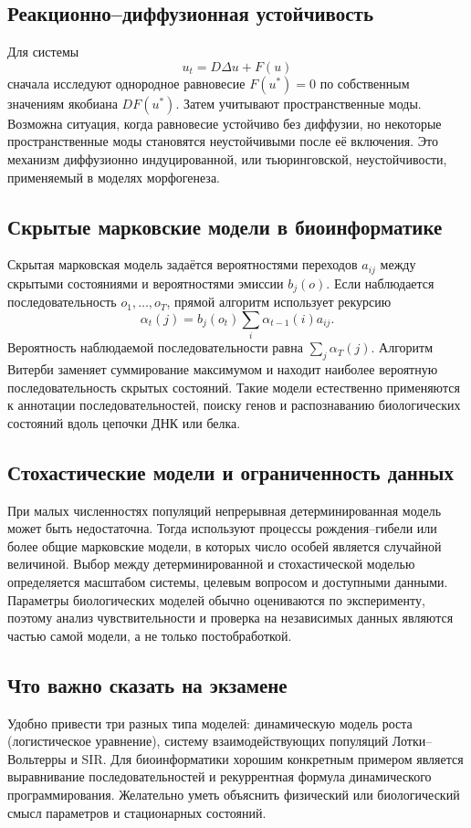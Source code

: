 \subsection{Реакционно--диффузионная устойчивость}

Для системы
\[
    u_t=D\Delta u+F(u)
\]
сначала исследуют однородное равновесие $F(u^*)=0$ по собственным значениям
якобиана $DF(u^*)$. Затем учитывают пространственные моды. Возможна ситуация,
когда равновесие устойчиво без диффузии, но некоторые пространственные моды
становятся неустойчивыми после её включения. Это механизм диффузионно
индуцированной, или тьюринговской, неустойчивости, применяемый в моделях
морфогенеза.

\subsection{Скрытые марковские модели в биоинформатике}

Скрытая марковская модель задаётся вероятностями переходов $a_{ij}$ между
скрытыми состояниями и вероятностями эмиссии $b_j(o)$. Если наблюдается
последовательность $o_1,\ldots,o_T$, прямой алгоритм использует рекурсию
\[
    \boxed{
    \alpha_t(j)
    =b_j(o_t)\sum_i\alpha_{t-1}(i)a_{ij}.
    }
\]
Вероятность наблюдаемой последовательности равна $\sum_j\alpha_T(j)$.
Алгоритм Витерби заменяет суммирование максимумом и находит наиболее вероятную
последовательность скрытых состояний. Такие модели естественно применяются к
аннотации последовательностей, поиску генов и распознаванию биологических
состояний вдоль цепочки ДНК или белка.

\subsection{Стохастические модели и ограниченность данных}

При малых численностях популяций непрерывная детерминированная модель может быть
недостаточна. Тогда используют процессы рождения--гибели или более общие
марковские модели, в которых число особей является случайной величиной. Выбор
между детерминированной и стохастической моделью определяется масштабом системы,
целевым вопросом и доступными данными. Параметры биологических моделей обычно
оцениваются по эксперименту, поэтому анализ чувствительности и проверка на
независимых данных являются частью самой модели, а не только постобработкой.

\subsection{Что важно сказать на экзамене}

Удобно привести три разных типа моделей: динамическую модель роста
(логистическое уравнение), систему взаимодействующих популяций
Лотки--Вольтерры и SIR. Для биоинформатики хорошим конкретным примером
является выравнивание последовательностей и рекуррентная формула
динамического программирования. Желательно уметь объяснить физический или
биологический смысл параметров и стационарных состояний.

\newpage
